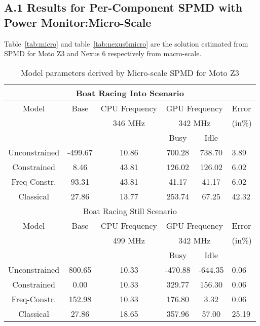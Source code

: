 \subsection*{A.1 Results for Per-Component SPMD with Power Monitor:Micro-Scale}
Table~\ref{tab:micro} and table~\ref{tab:nexus6micro} are the solution estimated from SPMD
for Moto Z3 and Nexus 6 respectively from macro-scale.

\begin{table}[]
\caption{Model parameters derived by Micro-scale SPMD for Moto Z3}
\vspace{-0.1in}
{\footnotesize
    \begin{tabular}{|c|c|c|c|c|p{5.4mm}|}
    \hline
    \multicolumn{6}{|c|}{Boat Racing Into Scenario} \\
        \hline
         Model & Base & \multicolumn{1}{c|}{CPU Frequency} & \multicolumn{2}{c|}{GPU Frequency} & Error \\
        \cline{3-5}
        &  & 346 MHz & \multicolumn{2}{c|}{342 MHz} & (in\%)\\
        \cline{3-5}
                & & \multicolumn{1}{|c|}{} & Busy & Idle & \\
        \hline
        Unconstrained & -499.67 & 10.86 & 700.28 & 738.70 & 3.89 \\
        Constrained & 8.46 & 43.81 & 126.02 & 126.02 & 6.02 \\
        Freq-Constr. & 93.31 & 43.81 & 41.17 & 41.17 & 6.02 \\
        \hline
        Classical & 27.86 & 13.77 & 253.74 & 67.25 & 42.32 \\
        \hline

    \multicolumn{6}{|c|}{Boat Racing Still Scenario} \\
        \hline
        Model & Base & \multicolumn{1}{c|}{CPU Frequency} & \multicolumn{2}{c|}{GPU Frequency} & Error \\
        \cline{3-5}
        &  & 499 MHz & \multicolumn{2}{c|}{342 MHz} & (in\%) \\
        \cline{3-5}
                & & \multicolumn{1}{|c|}{} & Busy & Idle & \\
        \hline
        Unconstrained & 800.65 & 10.33 & -470.88 & -644.35 & 0.06 \\
        Constrained & 0.00 & 10.33 & 329.77 & 156.30 & 0.06 \\
        Freq-Constr. & 152.98 & 10.33 & 176.80 & 3.32 & 0.06 \\
        \hline
        Classical & 27.86 & 18.65 & 357.96 & 57.00 & 25.19 \\
        \hline



\end{tabular}}
\end{table}
